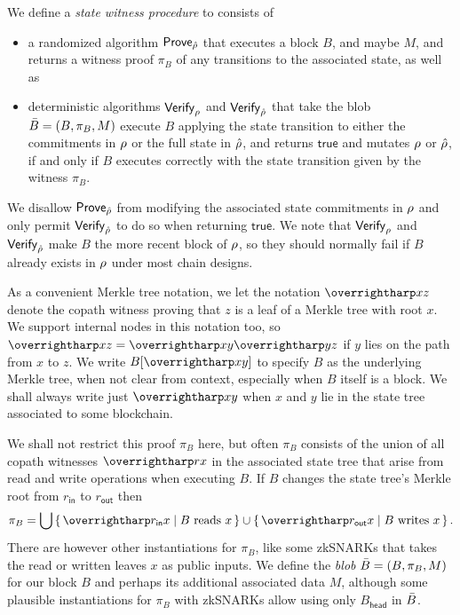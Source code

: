 \begin{definition}\label{def:pob}
We define a {\em state witness procedure} to consists of
\begin{itemize}

\item a randomized algorithm $\mathsf{Prove}_{\hat{\rho}}$ that executes a block $B$, and maybe $M$, and returns a witness proof $\pi_B$ of any transitions to the associated state, as well as 
\item deterministic algorithms $\mathsf{Verify}_{\rho}$ and $\mathsf{Verify}_{\hat{\rho}}$ that take the blob $\bar{B} = (B,\pi_B,M)$ execute $B$ applying the state transition to either the commitments in $\rho$ or the full state in $\hat{\rho}$, and returns $\mathsf{true}$ and mutates $\rho$ or $\hat{\rho}$, if and only if $B$ executes correctly with the state transition given by the witness $\pi_B$. 
\end{itemize}
\end{definition}
We disallow $\mathsf{Prove}_{\hat{\rho}}$ from modifying the associated state commitments in $\rho$ and only permit $\mathsf{Verify}_{\hat{\rho}}$ to do so when returning $\mathsf{true}$.  We note that $\mathsf{Verify}_{\rho}$ and $\mathsf{Verify}_{\hat{\rho}}$ make $B$ the more recent block of $\rho$, so they should normally fail if $B$ already exists in $\rho$ under most chain designs. 

As a convenient Merkle tree notation, we let the notation $\vect{xz}$ denote the copath witness proving that $z$ is a leaf of a Merkle tree with root $x$.  We support internal nodes in this notation too, so $\vect{xz} = \vect{xy} \vect{yz}$ if $y$ lies on the path from $x$ to $z$.  We write $B[\vect{xy}]$ to specify $B$ as the underlying Merkle tree, when not clear from context, especially when $B$ itself is a block.  We shall always write just $\vect{xy}$ when $x$ and $y$ lie in the state tree associated to some blockchain.  

\newcommand\rin{\ensuremath{r_{\mathsf{in}}}} %
\newcommand\rout{\ensuremath{r_{\mathsf{out}}}} %
We shall not restrict this proof $\pi_B$ here, but often $\pi_B$ consists of the union of all copath witnesses $\vect{rx}$ in the associated state tree that arise from read and write operations when executing $B$.  If $B$ changes the state tree's Merkle root from $\rin$ to $\rout$ then 
$$
\pi_B = 
  \bigcup \Setst{ \vect{\rin x} }{ \textrm{$B$ reads $x$} }
  \cup \Setst{ \vect{\rout x} }{ \textrm{$B$ writes $x$} } \mathperiod
$$
There are however other instantiations for $\pi_B$, like some zkSNARKs that takes the read or written leaves $x$ as public inputs.  We define the {\em blob} $\bar{B} = (B, \pi_B, M)$ for our block $B$ and perhaps its additional associated data $M$, although some plausible instantiations for $\pi_B$ with zkSNARKs allow using only $B_{\mathsf{head}}$ in $\bar{B}$.

